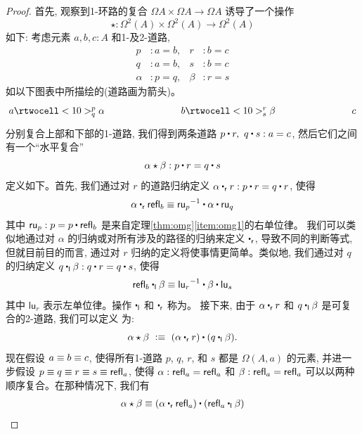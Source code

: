 \begin{proof}
首先, 观察到1-环路的复合 $\Omega A\times \Omega A\to \Omega A$ 诱导了一个操作
\[
\star : \Omega^2(A)\times \Omega^2(A)\to \Omega^2(A)
\]
如下: 考虑元素 $a, b, c : A$ 和1-及2-道路,
%
\begin{align*}
  p &: a = b,       &       r &: b = c \\
  q &: a = b,       &       s &: b = c \\
  \alpha &: p = q,  &   \beta &: r = s
\end{align*}
%
如以下图表中所描绘的(道路画为箭头)。
\[
 \xymatrix@+5em{
   {a} \rtwocell<10>^p_q{\alpha}
   &
   {b} \rtwocell<10>^r_s{\beta}
   &
   {c}
 }
\]
分别复合上部和下部的1-道路, 我们得到两条道路 $p\ct r,\ q\ct s : a = c$, 然后它们之间有一个``水平复合''
%
\begin{equation*}
  \alpha\hct\beta : p\ct r = q\ct s
\end{equation*}
%
定义如下。首先, 我们通过对 $r$ 的道路归纳定义 $\alpha \rightwhisker r : p\ct r = q\ct r$, 使得
\[ \alpha \rightwhisker \refl{b} \jdeq \opp{\mathsf{ru}_p} \ct \alpha \ct \mathsf{ru}_q \]
其中 $\mathsf{ru}_p : p = p \ct \refl{b}$ 是来自定理\ref{thm:omg}\ref{item:omg1}的右单位律。
我们可以类似地通过对 $\alpha$ 的归纳或对所有涉及的路径的归纳来定义 $\rightwhisker$, 导致不同的判断等式, 
但就目前目的而言, 通过对 $r$ 归纳的定义将使事情更简单。类似地, 我们通过对 $q$ 的归纳定义 $q\leftwhisker \beta : q\ct r = q\ct s$, 使得
\[ \refl{b} \leftwhisker \beta \jdeq \opp{\mathsf{lu}_r} \ct \beta \ct \mathsf{lu}_s \]
其中 $\mathsf{lu}_r$ 表示左单位律。操作 $\leftwhisker$ 和 $\rightwhisker$ 称为。
接下来, 由于 $\alpha \rightwhisker r$ 和 $q\leftwhisker \beta$ 是可复合的2-道路, 我们可以定义
%
%
为:
\[
\alpha\hct\beta\ \defeq\ (\alpha\rightwhisker r) \ct (q\leftwhisker \beta).
\]
现在假设 $a \equiv  b \equiv  c$, 使得所有1-道路 $p$, $q$, $r$, 和 $s$ 都是 $\Omega(A,a)$ 的元素, 并进一步假设 $p\equiv q \equiv r \equiv s\equiv \mathsf{refl}_{a}$, 使得 $\alpha:\mathsf{refl}_{a} = \mathsf{refl}_{a}$ 和 $\beta:\mathsf{refl}_{a} = \mathsf{refl}_{a}$ 可以以两种顺序复合。在那种情况下, 我们有
\begin{align*}
  \alpha\hct\beta
  &\jdeq (\alpha\rightwhisker\refl{a}) \ct (\refl{a}\leftwhisker \beta)\\

\end{align*}
\end{proof}
